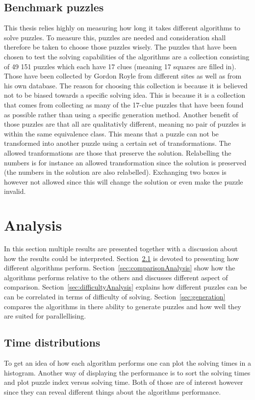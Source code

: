 \documentclass[a4paper,11pt]{kth-mag}
\begin{document}
\FloatBarrier
\section{Benchmark puzzles}
This thesis relies highly on measuring how long it takes different algorithms to solve puzzles. 
To measure this, puzzles are needed and consideration shall therefore be taken to choose those puzzles wisely.
The puzzles that have been chosen to test the solving capabilities of the algorithms are a collection consisting of 49 151 puzzles which each have 17 clues (meaning 17 squares are filled in). \cite{database} Those have been collected by Gordon Royle from different sites as well as from his own database.
The reason for choosing this collection is because it is believed not to be biased towards a specific solving idea.
This is because it is a collection that comes from collecting as many of the 17-clue puzzles that have been found as possible rather than using a specific generation method.
Another benefit of those puzzles are that all are qualitativly different, meaning no pair of puzzles is within the same equivalence class.
This means that a puzzle can not be transformed into another puzzle using a certain set of transformations.
The allowed tranformations are those that preserve the solution. Relabelling the numbers is for instance an allowed transformation since the solution is preserved (the numbers in the solution are also relabelled).
Exchanging two boxes is however not allowed since this will change the solution or even make the puzzle invalid.

\chapter{Analysis}
In this section multiple results are presented together with a discussion about how the results could be interpreted. 
Section~\ref{sec:timeDistributions} is devoted to presenting how different algorithms perform. 
Section~\ref{sec:comparisonAnalysis} show how the algorithms performs relative to the others and discusses different aspect of comparison.
Section~\ref{sec:difficultyAnalysis} explains how different puzzles can be can be correlated in terms of difficulty of solving.
Section~\ref{sec:generation} compares the algorithms in there ability to generate puzzles and how well they are suited for parallellising.

\FloatBarrier
\section{Time distributions}
\label{sec:timeDistributions}
To get an idea of how each algorithm performs one can plot the solving times in a histogram. 
Another way of displaying the performance is to sort the solving times and plot puzzle index versus solving time. 
Both of those are of interest however since they can reveal different things about the algorithms performance. 
\end{document}
